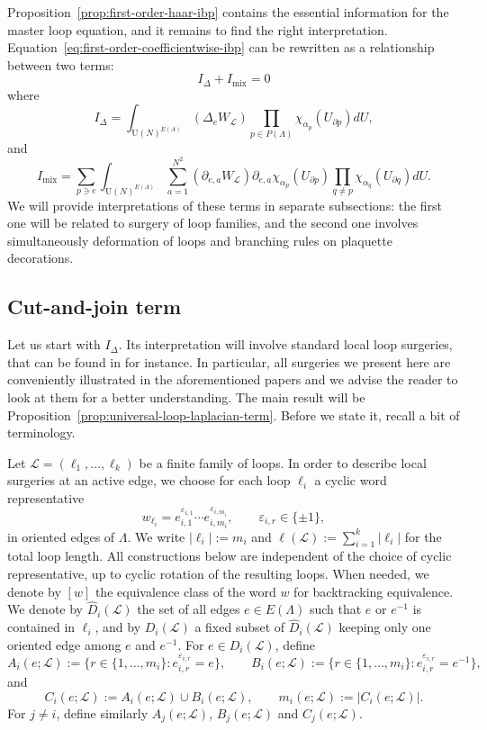 \documentclass[11pt,a4paper,reqno]{article}
\theoremstyle{definition}
\theoremstyle{remark}
\newcommand\U{{\mathrm U}}
\newcommand\Lc{{\mathcal{L}}}
\begin{document}
Proposition~\ref{prop:first-order-haar-ibp} contains the essential information for the master loop equation, and it remains to find the right interpretation. Equation~\eqref{eq:first-order-coefficientwise-ibp} can be rewritten as a relationship between two terms:
\begin{equation}
I_{\Delta}+ I_{\mathrm{mix}}=0
\end{equation}
where
\[
I_\Delta=\int_{\U(N)^{E(\Lambda)}}(\Delta_e W_{\Lc})\prod_{p\in P(\Lambda)}\chi_{\alpha_p}(U_{\partial p}) dU,
\]
and
\[
I_\mathrm{mix}=\sum_{p\ni e}\int_{\U(N)^{E(\Lambda)}}\sum_{a=1}^{N^2}(\partial_{e,a}W_{\Lc})\partial_{e,a}\chi_{\alpha_p}(U_{\partial p})\prod_{q\neq p}\chi_{\alpha_q}(U_{\partial q}) dU.
\]
We will provide interpretations of these terms in separate subsections: the first one will be related to surgery of loop families, and the second one involves simultaneously deformation of loops and branching rules on plaquette decorations.

\subsection{Cut-and-join term}\label{sec:cut-and-join}

Let us start with $I_\Delta$. Its interpretation will involve standard local loop surgeries, that can be found in \cite{Cha19,Jaf16,SSZ24,SSZ25b} for instance. In particular, all surgeries we present here are conveniently illustrated in the aforementioned papers and we advise the reader to look at them for a better understanding. The main result will be Proposition~\ref{prop:universal-loop-laplacian-term}. Before we state it, recall a bit of terminology.

Let $\Lc=(\ell_1,\ldots,\ell_k)$ be a finite family of loops. In order to describe local surgeries at an active edge, we choose for each loop $\ell_i$ a cyclic word representative
\[
w_{\ell_i}=e_{i,1}^{\varepsilon_{i,1}}\cdots e_{i,m_i}^{\varepsilon_{i,m_i}}, \qquad \varepsilon_{i,r}\in\{\pm1\},
\]
in oriented edges of $\Lambda$. We write $|\ell_i|:=m_i$ and $\ell(\Lc):=\sum_{i=1}^k |\ell_i|$ for the total loop length. All constructions below are independent of the choice of cyclic representative, up to cyclic rotation of the resulting loops. When needed, we denote by $[w]$ the equivalence class of the word $w$ for backtracking equivalence. We denote by $\widehat{D}_i(\Lc)$ the set of all edges $e\in E(\Lambda)$ such that $e$ or $e^{-1}$ is contained in $\ell_i$, and by $D_i(\Lc)$ a fixed subset of $\widehat{D}_i(\Lc)$ keeping only one oriented edge among $e$ and $e^{-1}$. For $e\in D_i(\Lc)$, define
\[
A_i(e;\Lc):=\{r\in\{1,\dots,m_i\}: e_{i,r}^{\varepsilon_{i,r}}=e\},\qquad B_i(e;\Lc):=\{r\in\{1,\dots,m_i\}: e_{i,r}^{\varepsilon_{i,r}}=e^{-1}\},
\]
and
\[
C_i(e;\Lc):=A_i(e;\Lc)\cup B_i(e;\Lc),\qquad m_i(e;\Lc):=|C_i(e;\Lc)|.
\]
For $j\neq i$, define similarly $A_j(e;\Lc)$, $B_j(e;\Lc)$ and $C_j(e;\Lc)$.
\end{document}
